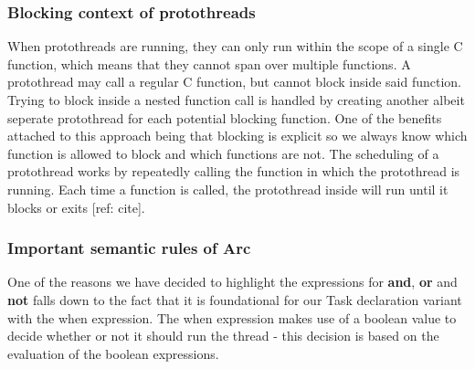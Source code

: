 \subsubsection{Blocking context of protothreads}\label{subsubsec:blockingContextOfProtothreads}
When protothreads are running, they can only run within the scope of a single C function, which means that they cannot span over multiple functions. A protothread may call a regular C function, but cannot block inside said function. Trying to block inside a nested function call is handled by creating another albeit seperate protothread for each potential blocking function. One of the benefits attached to this approach being that blocking is explicit so we always know which function is allowed to block and which functions are not. The scheduling of a protothread works by repeatedly calling the function in which the protothread is running. Each time a function is called, the protothread inside will run until it blocks or exits [ref: cite].


\subsubsection{Important semantic rules of Arc}\label{subsubsec:importantSemanticRulesOfArc}
One of the reasons we have decided to highlight the expressions for \textbf{and}, \textbf{or} and \textbf{not} falls down to the fact that it is foundational for our Task declaration variant with the when expression. The when expression makes use of a boolean value to decide whether or not it should run the thread - this decision is based on the evaluation of the boolean expressions.

